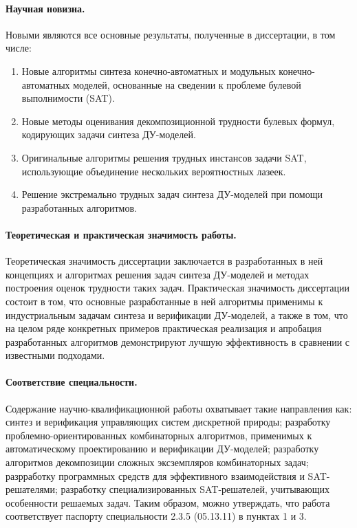\paragraph*{Научная новизна.}
%
Новыми являются все основные результаты, полученные в диссертации, в том числе:
\begin{enumerate}[beginpenalty=10000]
    \item Новые алгоритмы синтеза конечно-автоматных и модульных конечно-автоматных моделей, основанные на сведении к проблеме булевой выполнимости (SAT).

    \item Новые методы оценивания декомпозиционной трудности булевых формул, кодирующих задачи синтеза ДУ-моделей.

    \item Оригинальные алгоритмы решения трудных инстансов задачи SAT, использующие объединение нескольких вероятностных лазеек.

    \item Решение экстремально трудных задач синтеза ДУ-моделей при помощи разработанных алгоритмов.
\end{enumerate}


\paragraph*{Теоретическая и практическая значимость работы.}
%
Теоретическая значимость диссертации заключается в разработанных в ней концепциях и алгоритмах решения задач синтеза ДУ-моделей и методах построения оценок трудности таких задач.
Практическая значимость диссертации состоит в том, что основные разработанные в ней алгоритмы применимы к индустриальным задачам синтеза и верификации ДУ-моделей, а также в том, что на целом ряде конкретных примеров практическая реализация и апробация разработанных  алгоритмов демонстрируют лучшую эффективность в сравнении с известными подходами.


\paragraph*{Соответствие специальности.}
%
Содержание научно-квалификационной работы охватывает такие направления как: синтез и верификация управляющих систем дискретной природы; разработку проблемно-ориентированных комбинаторных алгоритмов, применимых к автоматическому проектированию и верификации ДУ-моделей; разработку алгоритмов декомпозиции сложных эксземпляров комбинаторных задач; разрработку программных средств для эффективного взаимодействия и SAT-решателями; разработку специализированных SAT-решателей, учитывающих особенности решаемых задач.
Таким образом, можно утверждать, что работа соответствует паспорту специальности 2.3.5 (05.13.11) в пунктах 1 и 3.


